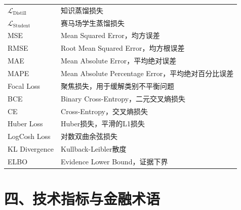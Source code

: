 \begin{longtable}{>{\raggedright\arraybackslash}p{4cm} p{10cm}}
$\mathcal{L}_{\text{Distill}}$ & 知识蒸馏损失 \\
$\mathcal{L}_{\text{Student}}$ & 赛马场学生蒸馏损失 \\
MSE & Mean Squared Error，均方误差 \\
RMSE & Root Mean Squared Error，均方根误差 \\
MAE & Mean Absolute Error，平均绝对误差 \\
MAPE & Mean Absolute Percentage Error，平均绝对百分比误差 \\
Focal Loss & 聚焦损失，用于缓解类别不平衡问题 \\
BCE & Binary Cross-Entropy，二元交叉熵损失 \\
CE & Cross-Entropy，交叉熵损失 \\
Huber Loss & Huber损失，平滑的L1损失 \\
LogCosh Loss & 对数双曲余弦损失 \\
KL Divergence & Kullback-Leibler散度 \\
ELBO & Evidence Lower Bound，证据下界 \\
\end{longtable}

\section*{四、技术指标与金融术语}

